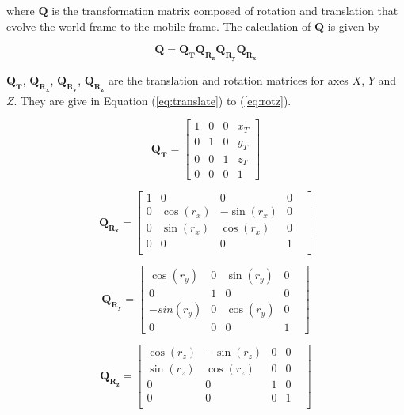 \noindent where $\boldsymbol{Q}$ is the transformation matrix composed
of rotation and translation that evolve the world frame to the mobile frame. The
calculation of $\boldsymbol{Q}$ is given by

\begin{equation}
\boldsymbol{Q}= \boldsymbol{Q_TQ_{R_z}Q_{R_y}Q_{R_x}}
\end{equation}

$\boldsymbol{Q_T}$, $\boldsymbol{Q_{R_x}}$, $\boldsymbol{Q_{R_y}}$,
$\boldsymbol{Q_{R_z}}$ are the translation and rotation matrices for axes
$X$, $Y$ and $Z$. They are give in Equation (\ref{eq:translate}) to
(\ref{eq:rotz}).

\begin{equation}
\label{eq:translate}
\boldsymbol{Q_T} = \begin{bmatrix}
1 & 0 & 0 & x_T \\
0 & 1 & 0 & y_T \\
0 & 0 & 1 & z_T \\
0 & 0 & 0 & 1 \end{bmatrix}
\end{equation}

\begin{equation}
\label{eq:rotx}
\boldsymbol{Q_{R_x}}= \begin{bmatrix}
1 & 0 & 0 & 0 & \\
0 & \cos (r_{x}) & -\sin (r_{x}) & 0 & \\
0 & \sin (r_{x}) & \cos (r_{x}) & 0 & \\
0 & 0 & 0 & 1 & \\
\end{bmatrix}
\end{equation}


\begin{equation}
\label{eq:roty}
\boldsymbol{Q_{R_y}}= \begin{bmatrix}
\cos (r_{y}) & 0 & \sin (r_{y}) & 0 & \\
0 & 1 & 0 & 0 & \\
-sin(r_{y}) & 0 & \cos (r_{y}) & 0 & \\
0 & 0 & 0 & 1 & 
\end{bmatrix}
\end{equation}


\begin{equation}
\label{eq:rotz}
\boldsymbol{Q_{R_z}}=\begin{bmatrix}
\cos (r_{z}) & -\sin (r_{z}) & 0 & 0 & \\
\sin (r_{z}) & \cos (r_{z}) & 0 & 0 & \\
0 & 0 & 1 & 0 & \\
0 & 0 & 0 & 1 & \\
\end{bmatrix}
\end{equation}

